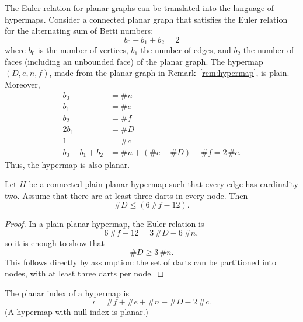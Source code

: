 \begin{remark}\label{rem:Euler}   
The Euler relation for planar graphs can be translated into the
language of hypermaps.  Consider a connected planar graph that
satisfies the Euler relation for the alternating sum of Betti
numbers:
\begin{displaymath}b_0 - b_1 + b_2 = 2\end{displaymath} where $b_0$
is the number of vertices, $b_1$ the number of edges, and $b_2$ the
number of faces (including an unbounded face) of the planar
graph. The hypermap $(D,e,n,f)$, made from the planar graph in
Remark~\ref{rem:hypermap}, is plain.  Moreover,
\begin{displaymath}\begin{array}{lll}
b_0 &= \# n\\
b_1 &= \# e\\
b_2 &= \# f\\
2b_1 &= \# D\\
1 &= \#c\\
b_0 - b_1 + b_2  &= \# n + (\#e - \#D) + \# f = 2\,\# c.
\end{array}
\end{displaymath}
Thus, the hypermap is also planar.
\end{remark}


\begin{lemma}\label{lemma:dart-upper} 
Let $H$ be a connected plain planar hypermap such that every edge
has cardinality two.  Assume that there are at least three darts in
every node.  Then
\begin{displaymath}
\# D \le (6\, \#f - 12).
\end{displaymath}
\end{lemma}
%

\begin{proof}  In a plain planar hypermap, the Euler relation is
\begin{displaymath}6\, \#f - 12 = 3\,\#D - 6\,\#n,\end{displaymath}
so it is enough to show that
\begin{displaymath}
\# D \ge 3\,\#n.
\end{displaymath}
This follows directly by assumption: the set of darts can be
partitioned into nodes, with at least three darts per node.
\end{proof}


\begin{definition} The planar index of a hypermap is
\begin{displaymath}\iota = \# f + \# e + \# n - \# D - 2\,\#
c.\end{displaymath}
(A hypermap with null index is planar.)
%
%
\end{definition}

